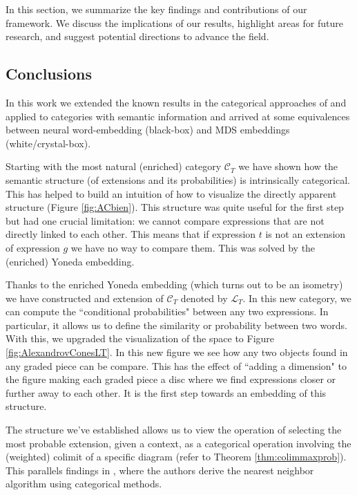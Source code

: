 \documentclass[10pt,a4paper]{elsarticle}
\newcommand{\C}{\mathcal{C}}
\renewcommand{\L}{\mathcal{L}}
\begin{document}
In this section, we summarize the key findings and contributions of our framework. We discuss the implications of our results, highlight areas for future research, and suggest potential directions to advance the field. 

\subsection{Conclusions}
In this work we extended the known results in the categorical approaches of \citep{CatSem} and \citep{perrone2023markov} applied to categories with semantic information and arrived at some equivalences between neural word-embedding (black-box) and MDS embeddings (white/crystal-box).

Starting with the most natural (enriched) category $\C_{T}$ we have shown how the semantic structure (of extensions and its probabilities) is intrinsically categorical. This has helped to build an intuition of how to visualize the directly apparent structure (Figure \ref{fig:ACbien}). This structure was quite useful for the first step but had one crucial limitation: we cannot compare expressions that are not directly linked to each other. This means that if expression $t$ is not an extension of expression $g$ we have no way to compare them. This was solved by the (enriched) Yoneda embedding. 

Thanks to the enriched Yoneda embedding (which turns out to be an isometry) we have constructed and extension of $\C_{T}$ denoted by $\L_{T}$. In this new category, we can compute the ``conditional probabilities" between any two expressions. In particular, it allows us to define the similarity or probability between two words. With this, we upgraded the visualization of the space to Figure \ref{fig:AlexandrovConesLT}. In this new figure we see how any two objects found in any graded piece can be compare. This has the effect of ``adding a dimension" to the figure making each graded piece a disc where we find expressions closer or further away to each other. It is the first step towards an embedding of this structure.


The structure we've established allows us to view the operation of selecting the most probable extension, given a context, as a categorical operation involving the (weighted) colimit of a specific diagram (refer to Theorem \ref{thm:colimmaxprob}). This parallels findings in \citep{pugh2023using}, where the authors derive the nearest neighbor algorithm using categorical methods.
\end{document}
